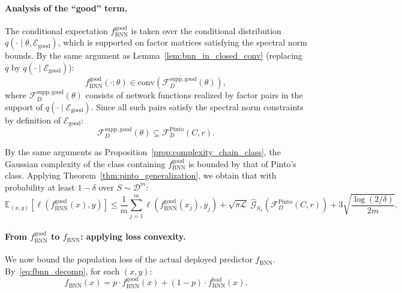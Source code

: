 \documentclass{article}
\theoremstyle{plain}
\theoremstyle{definition}
\theoremstyle{remark}
\begin{document}
\paragraph{Analysis of the ``good'' term.}
The conditional expectation $f_{\mathrm{BNN}}^{\text{good}}$ is taken over the conditional distribution $q(\cdot\mid\theta, \mathcal{E}_{\text{good}})$, which is supported on factor matrices satisfying the spectral norm bounds. By the same argument as Lemma~\ref{lem:bnn_in_closed_conv} (replacing $q$ by $q(\cdot \mid \mathcal{E}_{\text{good}})$):
\begin{equation}
    f_{\mathrm{BNN}}^{\text{good}}(\cdot; \theta) \in \overline{\mathrm{conv}(\mathcal{F}_D^{\mathrm{supp},\text{good}}(\theta))},
\end{equation}
where $\mathcal{F}_D^{\mathrm{supp},\text{good}}(\theta)$ consists of network functions realized by factor pairs in the support of $q(\cdot \mid \mathcal{E}_{\text{good}})$. Since all such pairs satisfy the spectral norm constraints by definition of $\mathcal{E}_{\text{good}}$:
\begin{equation}
    \mathcal{F}_D^{\mathrm{supp},\text{good}}(\theta) \subseteq \mathcal{F}_D^{\mathrm{Pinto}}(C,r).
\end{equation}

By the same arguments as Proposition~\ref{prop:complexity_chain_class}, the Gaussian complexity of the class containing $f_{\mathrm{BNN}}^{\text{good}}$ is bounded by that of Pinto's class. Applying Theorem~\ref{thm:pinto_generalization}, we obtain that with probability at least $1-\delta$ over $S \sim \mathcal{D}^m$:
\begin{equation}\label{eq:gen_bound_good}
    \mathbb{E}_{(x,y)}[\ell(f_{\mathrm{BNN}}^{\text{good}}(x), y)]
    \le
    \frac{1}{m}\sum_{j=1}^m \ell(f_{\mathrm{BNN}}^{\text{good}}(x_j), y_j)
    + \sqrt{\pi\mathcal{L}}\;\hat{\mathcal{G}}_{S_x}(\mathcal{F}_D^{\mathrm{Pinto}}(C,r))
    + 3\sqrt{\frac{\log(2/\delta)}{2m}}.
\end{equation}

\paragraph{From $f_{\mathrm{BNN}}^{\text{good}}$ to $f_{\mathrm{BNN}}$: applying loss convexity.}
We now bound the population loss of the actual deployed predictor $f_{\mathrm{BNN}}$. By~\eqref{eq:fbnn_decomp}, for each $(x,y)$:
\[
f_{\mathrm{BNN}}(x) = p \cdot f_{\mathrm{BNN}}^{\text{good}}(x) + (1-p) \cdot f_{\mathrm{BNN}}^{\text{bad}}(x).
\]
\end{document}
